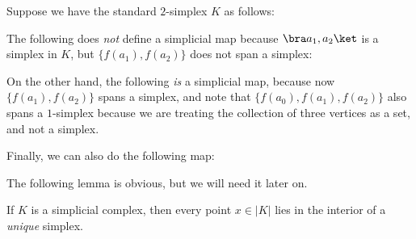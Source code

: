 \documentclass[a4paper]{article}
\begin{document}
\begin{eg}
  Suppose we have the standard $2$-simplex $K$ as follows:
  \begin{center}
  \end{center}
  The following does \emph{not} define a simplicial map because $\bra a_1, a_2\ket$ is a simplex in $K$, but $\{f(a_1), f(a_2)\}$ does not span a simplex:
  \begin{center}
  \end{center}
  On the other hand, the following \emph{is} a simplicial map, because now $\{f(a_1), f(a_2)\}$ spans a simplex, and note that $\{f(a_0), f(a_1), f(a_2)\}$ also spans a $1$-simplex because we are treating the collection of three vertices as a set, and not a simplex.
  \begin{center}
  \end{center}
  Finally, we can also do the following map:
  \begin{center}
  \end{center}
\end{eg}

The following lemma is obvious, but we will need it later on.
\begin{lemma}
  If $K$ is a simplicial complex, then every point $x \in |K|$ lies in the interior of a \emph{unique} simplex.
\end{lemma}
\end{document}
